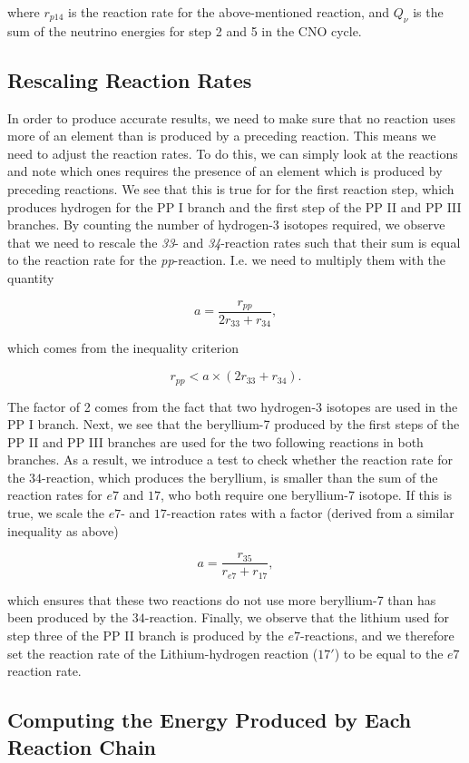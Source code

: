 \documentclass[a4paper,10pt,english]{article}
\begin{document}
where $r_{p14}$ is the reaction rate for the above-mentioned reaction, and $Q_\nu$ is the sum of the neutrino energies for step 2 and 5 in the CNO cycle.

\subsection{Rescaling Reaction Rates}

In order to produce accurate results, we need to make sure that no reaction uses more of an element than is produced by a preceding reaction. This means we need to adjust the reaction rates. To do this, we can simply look at the reactions and note which ones requires the presence of an element which is produced by preceding reactions. We see that this is true for for the first reaction step, which produces hydrogen for the PP I branch and the first step of the PP II and PP III branches. By counting the number of hydrogen-3 isotopes required, we observe that we need to rescale the \textit{33}- and \textit{34}-reaction rates such that their sum is equal to the reaction rate for the \textit{pp}-reaction. I.e. we need to multiply them with the quantity 

$$a = \frac{r_{pp}}{2r_{33} + r_{34}},$$

which comes from the inequality criterion 

$$r_{pp} < a\times (2r_{33} + r_{34}).$$

The factor of 2 comes from the fact that two hydrogen-3 isotopes are used in the PP I branch. Next, we see that the beryllium-7 produced by the first steps of the PP II and PP III branches are used for the two following reactions in both branches. As a result, we introduce a test to check whether the reaction rate for the $34$-reaction, which produces the beryllium, is smaller than the sum of the reaction rates for $e7$ and $17$, who both require one beryllium-7 isotope. If this is true, we scale the $e7$- and $17$-reaction rates with a factor (derived from a similar inequality as above)

$$a = \frac{r_{35}}{r_{e7} + r_{17}},$$

which ensures that these two reactions do not use more beryllium-7 than has been produced by the $34$-reaction. Finally, we observe that the lithium used for step three of the PP II branch is produced by the $e7$-reactions, and we therefore set the reaction rate of the Lithium-hydrogen reaction ($17'$) to be equal to the $e7$ reaction rate. 


\subsection{Computing the Energy Produced by Each Reaction Chain}
\end{document}
